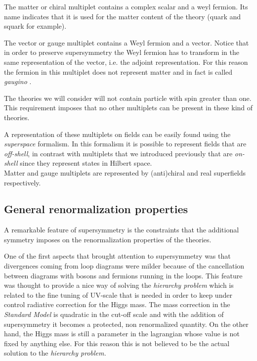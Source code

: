 The matter or chiral multiplet contains a complex scalar and a weyl fermion. Its name indicates that it is used for the matter content of the theory (quark and squark for example).

The vector or gauge multiplet contains a Weyl fermion and a vector. 
Notice that in order to preserve supersymmetry the Weyl fermion has to transform in the same representation of the vector, i.e. the adjoint representation.
For this reason the fermion in this multiplet does not represent matter and in fact is called \emph{gaugino} .

The theories we will consider will not contain particle with spin greater than one.
This requirement imposes that no other multiplets can be present in these kind of theories.

A representation of these multiplets on fields can be easily found using the \emph{superspace} formalism.
In this formalism it is possible to represent fields  that are \emph{off-shell}, in contrast with multiplets that we introduced previously that are \emph{on-shell} since they represent states in Hilbert space.\\
Matter and gauge multiplets are represented by (anti)chiral and real superfields respectively.



\subsection{ General renormalization properties}

A remarkable feature of supersymmetry is the constraints that the additional symmetry imposes on the renormalization properties of the theories.

One of the first aspects that brought attention to supersymmetry was that divergences coming from loop diagrams were milder because of the cancellation between diagrams with bosons and fermions running in the loops. 
This feature was thought to provide a nice way of solving the \emph{hierarchy problem} which is related to the fine tuning of UV-scale that is needed in order to keep under control radiative correction for the Higgs mass.
The mass correction in the \emph{Standard Model} is quadratic in the cut-off scale and with the addition of supersymmetry it becomes a protected, non renormalized quantity. 
On the other hand, the Higgs mass is still a parameter in the lagrangian whose value is not fixed by anything else.
For this reason this is not believed to be the actual solution to the \emph{hierarchy problem.} 

